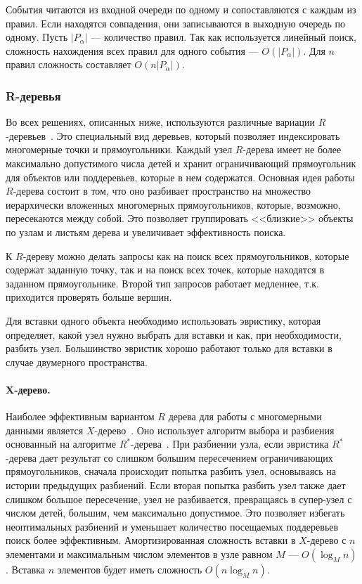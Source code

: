 \documentclass[14pt]{article}
\begin{document}
События читаются из входной очереди по одному и сопоставляются с каждым из правил. Если находятся совпадения, они записываются в выходную очередь по одному. Пусть $|P_\alpha|$ --- количество правил. Так как используется линейный поиск, сложность нахождения всех правил для одного события --- $O(|P_\alpha|)$. Для $n$ правил сложность составляет $O(n|P_\alpha|)$.

\subsubsection{R-деревья}
Во всех решениях, описанных ниже, используются различные вариации $R$-деревьев~\cite{r-tree}. Это специальный вид деревьев, который позволяет индексировать многомерные точки и прямоугольники. Каждый узел $R$-дерева имеет не более максимально допустимого числа детей и хранит ограничивающий прямоугольник для объектов или поддеревьев, которые в нем содержатся. Основная идея работы $R$-дерева состоит в том, что оно разбивает пространство на множество иерархически вложенных многомерных прямоугольников, которые, возможно, пересекаются между собой. Это позволяет группировать <<близкие>> объекты по узлам и листьям дерева и увеличивает эффективность поиска.

К $R$-дереву можно делать запросы как на поиск всех прямоугольников, которые содержат заданную точку, так и на поиск всех точек, которые находятся в заданном прямоугольнике. Второй тип запросов работает медленнее, т.к. приходится проверять больше вершин.

Для вставки одного объекта необходимо использовать эвристику, которая определяет, какой узел нужно выбрать для вставки и как, при необходимости, разбить узел. Большинство эвристик хорошо работают только для вставки в случае двумерного пространства.

\paragraph{X-дерево.} Наиболее эффективным вариантом $R$ дерева для работы с многомерными данными является $X$-дерево~\cite{x-tree}. Оно использует алгоритм выбора и разбиения основанный на алгоритме $R^*$-дерева~\cite{r-star-tree}. При разбиении узла, если эвристика $R^*$-дерева дает результат со слишком большим пересечением ограничивающих прямоугольников, сначала происходит попытка разбить узел, основываясь на истории предыдущих разбиений. Если вторая попытка разбить узел также дает слишком большое пересечение, узел не разбивается, превращаясь в супер-узел с числом детей, большим, чем максимально допустимое. Это позволяет избегать неоптимальных разбиений и уменьшает количество посещаемых поддеревьев поиск более эффективным. Амортизированная сложность вставки в $X$-дерево с $n$ элементами и максимальным числом элементов в узле равном $M$ --- $O(\log_M n)$. Вставка $n$ элементов будет иметь сложность $O(n\log_M n)$.
\end{document}
